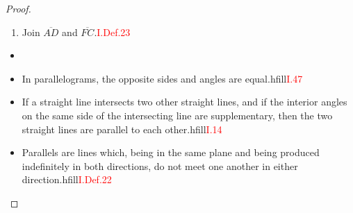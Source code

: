 \begin{proof}
\begin{con}
\begin{enumerate}
        \clearpage
        
        \item Join $\overline{AD}$ and $\overline{FC}$.\hfill\textcolor{red}{I.Def.23}
    \end{enumerate}
\end{con}

\begin{figure}[H]
	\caption{}
\end{figure}

\begin{itemize}

\item[]

 \item In parallelograms, the opposite sides and angles are equal.hfill\textcolor{red}{I.47}
    
    \item If a straight line intersects two other straight lines, and if the interior angles on the same side of the intersecting line are supplementary, then the two straight lines are parallel to each other.hfill\textcolor{red}{I.14}
    
    \item Parallels are lines which, being in the same plane and being produced indefinitely in both directions, do not meet one another in either direction.hfill\textcolor{red}{I.Def.22}
    

\end{itemize}
\end{proof}
